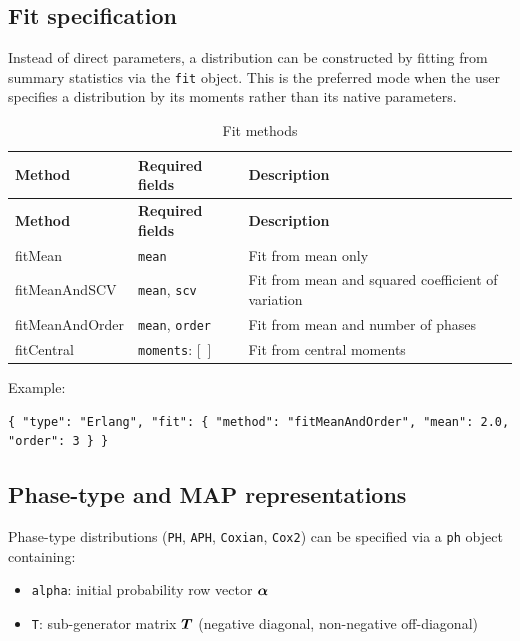\subsection{Fit specification}
\label{json:dist-fit}

Instead of direct parameters, a distribution can be constructed by fitting from summary statistics via the \texttt{fit} object. This is the preferred mode when the user specifies a distribution by its moments rather than its native parameters.

\begin{footnotesize}
\begin{longtable}{|T{3.0cm}|T{3.2cm}|D{6.7cm}|}
\caption{Fit methods}\label{tab:json-fit}
\\\hline
\textbf{Method} & \textbf{Required fields} & \textbf{Description} \\\hline
\endfirsthead
\hline \textbf{Method} & \textbf{Required fields} & \textbf{Description} \\\hline
\endhead
\hline
\endfoot
fitMean         & \texttt{mean}          & Fit from mean only \\\hline
fitMeanAndSCV   & \texttt{mean}, \texttt{scv} & Fit from mean and squared coefficient of variation \\\hline
fitMeanAndOrder & \texttt{mean}, \texttt{order} & Fit from mean and number of phases \\\hline
fitCentral      & \texttt{moments}: [~]  & Fit from central moments \\\hline
\end{longtable}
\end{footnotesize}

\noindent Example:
\begin{lstlisting}[basicstyle=\ttfamily\scriptsize]
{ "type": "Erlang", "fit": { "method": "fitMeanAndOrder", "mean": 2.0, "order": 3 } }
\end{lstlisting}

\subsection{Phase-type and MAP representations}
\label{json:dist-ph}

Phase-type distributions (\texttt{PH}, \texttt{APH}, \texttt{Coxian}, \texttt{Cox2}) can be specified via a \texttt{ph} object containing:
\begin{itemize}
\item \texttt{alpha}: initial probability row vector $\boldsymbol{\alpha}$
\item \texttt{T}: sub-generator matrix $\boldsymbol{T}$ (negative diagonal, non-negative off-diagonal)
\end{itemize}

